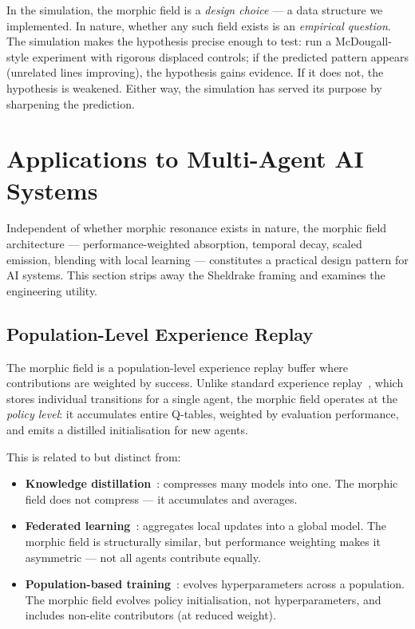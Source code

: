 \documentclass[twoside,11pt]{article}
\begin{document}
In the simulation, the morphic field is a \emph{design choice} --- a data
structure we implemented.  In nature, whether any such field exists is an
\emph{empirical question}.  The simulation makes the hypothesis precise enough
to test: run a McDougall-style experiment with rigorous displaced controls; if
the predicted pattern appears (unrelated lines improving), the hypothesis gains
evidence.  If it does not, the hypothesis is weakened.  Either way, the
simulation has served its purpose by sharpening the prediction.


\section{Applications to Multi-Agent AI Systems}
\label{sec:applications}

Independent of whether morphic resonance exists in nature, the morphic field
architecture --- performance-weighted absorption, temporal decay, scaled
emission, blending with local learning --- constitutes a practical design
pattern for AI systems.  This section strips away the Sheldrake framing and
examines the engineering utility.

\subsection{Population-Level Experience Replay}
\label{sec:applications:replay}

The morphic field is a population-level experience replay buffer where
contributions are weighted by success.  Unlike standard experience
replay~\citep{schaul2015}, which stores individual transitions for a single
agent, the morphic field operates at the \emph{policy level}: it accumulates
entire Q-tables, weighted by evaluation performance, and emits a distilled
initialisation for new agents.

This is related to but distinct from:
\begin{itemize}[leftmargin=2em]
    \item \textbf{Knowledge distillation}~\citep{hinton2015}: compresses
          many models into one.  The morphic field does not compress --- it
          accumulates and averages.
    \item \textbf{Federated learning}~\citep{mcmahan2017}: aggregates local
          updates into a global model.  The morphic field is structurally
          similar, but performance weighting makes it asymmetric --- not all
          agents contribute equally.
    \item \textbf{Population-based training}~\citep{jaderberg2017}: evolves
          hyperparameters across a population.  The morphic field evolves
          policy initialisation, not hyperparameters, and includes non-elite
          contributors (at reduced weight).
\end{itemize}
\end{document}
